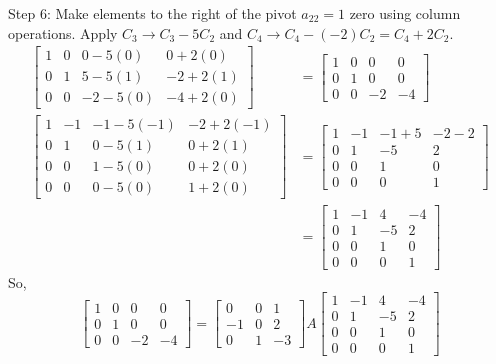 \documentclass{article}
\begin{document}
Step 6: Make elements to the right of the pivot $a_{22}=1$ zero using column operations.
Apply $C_3 \to C_3 - 5C_2$ and $C_4 \to C_4 - (-2)C_2 = C_4 + 2C_2$.
\begin{align*} \begin{bmatrix} 1 & 0 & 0 - 5(0) & 0 + 2(0) \\ 0 & 1 & 5 - 5(1) & -2 + 2(1) \\ 0 & 0 & -2 - 5(0) & -4 + 2(0) \end{bmatrix} &= \begin{bmatrix} 1 & 0 & 0 & 0 \\ 0 & 1 & 0 & 0 \\ 0 & 0 & -2 & -4 \end{bmatrix} \\ \begin{bmatrix} 1 & -1 & -1 - 5(-1) & -2 + 2(-1) \\ 0 & 1 & 0 - 5(1) & 0 + 2(1) \\ 0 & 0 & 1 - 5(0) & 0 + 2(0) \\ 0 & 0 & 0 - 5(0) & 1 + 2(0) \end{bmatrix} &= \begin{bmatrix} 1 & -1 & -1 + 5 & -2 - 2 \\ 0 & 1 & -5 & 2 \\ 0 & 0 & 1 & 0 \\ 0 & 0 & 0 & 1 \end{bmatrix} \\ &= \begin{bmatrix} 1 & -1 & 4 & -4 \\ 0 & 1 & -5 & 2 \\ 0 & 0 & 1 & 0 \\ 0 & 0 & 0 & 1 \end{bmatrix}\end{align*}
So,
\[ \begin{bmatrix} 1 & 0 & 0 & 0 \\ 0 & 1 & 0 & 0 \\ 0 & 0 & -2 & -4 \end{bmatrix} = \begin{bmatrix} 0 & 0 & 1 \\ -1 & 0 & 2 \\ 0 & 1 & -3 \end{bmatrix} A \begin{bmatrix} 1 & -1 & 4 & -4 \\ 0 & 1 & -5 & 2 \\ 0 & 0 & 1 & 0 \\ 0 & 0 & 0 & 1 \end{bmatrix} \]
\end{document}
